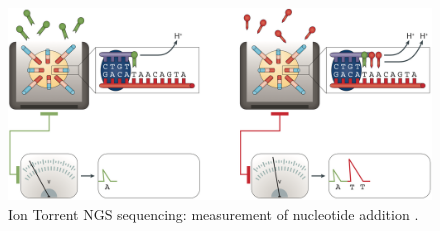 \begin{figure}[ht]
    \centering
    \includegraphics[width=\textwidth]{Images/chapter_3/NGS_sequencing.png}
    \caption{Ion Torrent NGS sequencing: measurement of nucleotide addition \cite{NGS}.}
    \label{fig:NGS_sequencing}
\end{figure}




